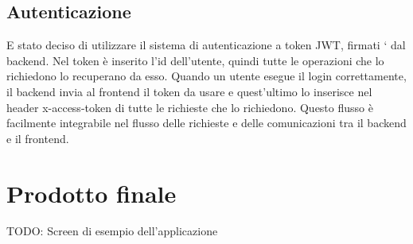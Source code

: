 \subsection{Autenticazione}
E stato deciso di utilizzare il sistema di autenticazione a token JWT, firmati `
dal backend.
Nel token è inserito l'id dell'utente, quindi tutte le operazioni che lo
richiedono lo recuperano da esso.
Quando un utente esegue il login correttamente, il backend invia al frontend
il token da usare e quest’ultimo lo inserisce nel header x-access-token di tutte
le richieste che lo richiedono.
Questo flusso è facilmente integrabile nel flusso delle richieste e delle comunicazioni tra il backend e il frontend.

\section{Prodotto finale}
TODO: Screen di esempio dell'applicazione
